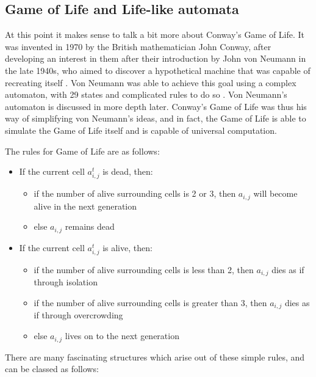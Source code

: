 \documentclass[11pt,a4paper]{article}
\begin{document}
    \subsection{Game of Life and Life-like automata}
    At this point it makes sense to talk a bit more about Conway's Game of Life.
    It was invented in 1970 by the British mathematician John Conway, after
    developing an interest in them after their introduction by John von Neumann
    in the late 1940s, who aimed to discover a hypothetical machine that was
    capable of recreating itself \cite{GameOfLife}. Von Neumann was able to
    achieve this goal using a complex automaton, with 29 states and complicated
    rules to do so \cite{VonNeumannCA}. Von Neumann's automaton is discussed in
    more depth later. Conway's Game of Life was thus his way of simplifying von
    Neumann's ideas, and in fact, the Game of Life is able to simulate the Game
    of Life itself and is capable of universal computation.

    The rules for Game of Life are as follows:

    \begin{itemize}
        \item If the current cell $a_{i,j}^t$ is dead, then:
            \begin{itemize}
                \item if the number of alive surrounding cells is 2 or 3,
                    then $a_{i,j}$ will become alive in the next generation
                \item else $a_{i,j}$ remains dead
            \end{itemize}
        \item If the current cell $a_{i,j}^t$ is alive, then:
            \begin{itemize}
                \item if the number of alive surrounding cells is less than 2,
                    then $a_{i,j}$ dies as if through isolation
                \item if the number of alive surrounding cells is greater than
                    3, then $a_{i,j}$ dies as if through overcrowding
                \item else $a_{i,j}$ lives on to the next generation
            \end{itemize}
    \end{itemize}

    There are many fascinating structures which arise out of these simple rules,
    and can be classed as follows:
\end{document}
